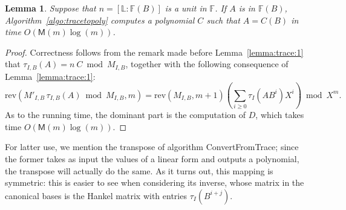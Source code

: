 \documentclass[12pt]{article}
\def\M {\ensuremath{\mathsf{M}}}
\def\F {\ensuremath{\mathbb{F}}}
\def\L {\ensuremath{\mathbb{L}}}
\def\mulmod {\ensuremath{\mathrm{mulmod}}}
\def\rev {\ensuremath{\mathrm{rev}}}
\newtheorem{Lemma}{Lemma}
\begin{document}
\begin{Lemma}
  Suppose that $n=[\L:\F(B)]$ is a unit in $\F$. If $A$ is in
  $\F(B)$, Algorithm~\ref{algo:tracetopoly} computes a polynomial $C$
  such that $A=C(B)$ in time $O(\M(m)\log(m))$.
\end{Lemma}
\begin{proof}
  Correctness follows from the remark made before
  Lemma~\ref{lemma:trace:1} that $\tau_{I,B}(A)=n \ C \bmod M_{I,B}$,
  together with the following consequence of Lemma~\ref{lemma:trace:1}:
$$ \rev( M'_{I,B}\, \tau_{I,B}  (A) \bmod M_{I,B},m) = \rev(M_{I,B},m+1) \left (\sum_{i \ge 0} \tau_I(A B^i) X^i \right )  \bmod X^m.$$
  As to the running time, the dominant part is the computation of $D$,
  which takes time $O(\M(m)\log(m))$.
\end{proof}

For latter use, we mention the transpose of algorithm
ConvertFromTrace; since the former takes as input the values of a
linear form and outputs a polynomial, the transpose will actually do
the same. As it turns out, this mapping is symmetric: this is easier
to see when considering its inverse, whose matrix in the canonical
bases is the Hankel matrix with entries $\tau_I(B^{i+j})$.


\end{document}
